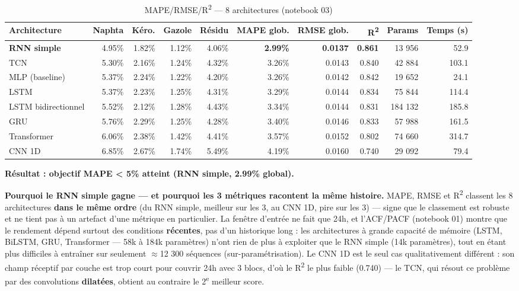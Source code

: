 \documentclass[11pt]{article}
\begin{document}
\begin{table}[h]
\centering
\small
\begin{tabular}{lrrrrrrrrr}
\toprule
Architecture & Naphta & Kéro. & Gazole & Résidu & \textbf{MAPE glob.} & \textbf{RMSE glob.} & \textbf{R\textsuperscript{2}} & Params & Temps (s) \\
\midrule
\textbf{RNN simple} & 4.95\% & 1.82\% & 1.12\% & 4.06\% & \textbf{2.99\%} & \textbf{0.0137} & \textbf{0.861} & 13 956 & 52.9 \\
TCN & 5.30\% & 2.16\% & 1.24\% & 4.32\% & 3.26\% & 0.0143 & 0.840 & 42 884 & 103.1 \\
MLP (baseline) & 5.37\% & 2.24\% & 1.22\% & 4.20\% & 3.26\% & 0.0142 & 0.842 & 19 652 & 24.1 \\
LSTM & 5.37\% & 2.23\% & 1.25\% & 4.31\% & 3.29\% & 0.0144 & 0.834 & 75 844 & 114.4 \\
LSTM bidirectionnel & 5.52\% & 2.12\% & 1.28\% & 4.43\% & 3.34\% & 0.0144 & 0.831 & 184 132 & 185.8 \\
GRU & 5.76\% & 2.29\% & 1.25\% & 4.28\% & 3.40\% & 0.0146 & 0.833 & 57 988 & 161.5 \\
Transformer & 6.06\% & 2.38\% & 1.42\% & 4.41\% & 3.57\% & 0.0152 & 0.802 & 74 660 & 314.7 \\
CNN 1D & 6.85\% & 2.67\% & 1.74\% & 5.49\% & 4.19\% & 0.0160 & 0.740 & 29 092 & 79.4 \\
\bottomrule
\end{tabular}
\caption{MAPE/RMSE/R\textsuperscript{2} — 8 architectures (notebook 03)}
\end{table}

\textbf{Résultat : objectif MAPE < 5\% atteint (RNN simple, 2.99\% global). \checkmark}

\textbf{Pourquoi le RNN simple gagne — et pourquoi les 3 métriques racontent la même histoire.}
MAPE, RMSE et R\textsuperscript{2} classent les 8 architectures \textbf{dans le même ordre} (du
RNN simple, meilleur sur les 3, au CNN 1D, pire sur les 3) — signe que le classement est robuste
et ne tient pas à un artefact d'une métrique en particulier. La fenêtre d'entrée ne fait que 24h,
et l'ACF/PACF (notebook 01) montre que le rendement dépend surtout des conditions
\textbf{récentes}, pas d'un historique long : les architectures à grande capacité de mémoire
(LSTM, BiLSTM, GRU, Transformer — 58k à 184k paramètres) n'ont rien de plus à exploiter que le
RNN simple (14k paramètres), tout en étant plus difficiles à entraîner sur seulement
$\approx$12 300 séquences (sur-paramétrisation). Le CNN 1D est le seul cas qualitativement
différent : son champ réceptif par couche est trop court pour couvrir 24h avec 3 blocs, d'où le
R\textsuperscript{2} le plus faible (0.740) — le TCN, qui résout ce problème par des convolutions
\textbf{dilatées}, obtient au contraire le 2\textsuperscript{e} meilleur score.
\end{document}
